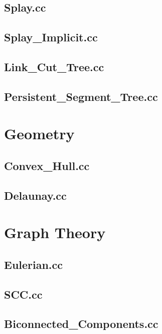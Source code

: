 \subsection{Splay.cc}

\subsection{Splay\_Implicit.cc}

\subsection{Link\_Cut\_Tree.cc}

\subsection{Persistent\_Segment\_Tree.cc}

\section{Geometry}
\subsection{Convex\_Hull.cc}

\subsection{Delaunay.cc}

\section{Graph Theory}
\subsection{Eulerian.cc}

\subsection{SCC.cc}

\subsection{Biconnected\_Components.cc}


